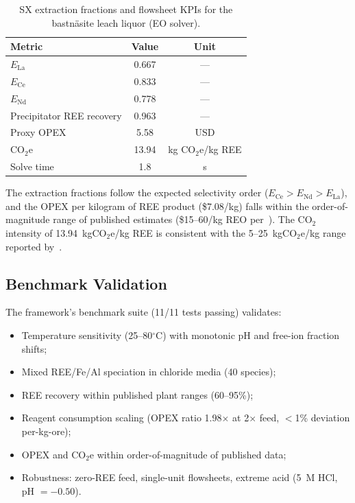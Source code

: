 \documentclass[11pt]{article}
\begin{document}
\begin{table}[t]
  \centering
  \caption{SX extraction fractions and flowsheet KPIs for the
    bastn\"asite leach liquor (EO solver).}
  \label{tab:sx_results}
  \begin{tabular}{@{}lcc@{}}
    \toprule
    Metric & Value & Unit \\
    \midrule
    $E_{\text{La}}$ & 0.667 & --- \\
    $E_{\text{Ce}}$ & 0.833 & --- \\
    $E_{\text{Nd}}$ & 0.778 & --- \\
    Precipitator REE recovery & 0.963 & --- \\
    Proxy OPEX & 5.58 & USD \\
    CO$_2$e & 13.94 & kg CO$_2$e/kg REE \\
    Solve time & 1.8 & s \\
    \bottomrule
  \end{tabular}
\end{table}

The extraction fractions follow the expected selectivity order
($E_{\text{Ce}} > E_{\text{Nd}} > E_{\text{La}}$), and the OPEX per
kilogram of REE product (\$7.08/kg) falls within the order-of-magnitude
range of published estimates (\$15--60/kg REO per~\citet{golev2014rare}).
The CO$_2$ intensity of 13.94~kgCO$_2$e/kg REE is consistent with the
5--25~kgCO$_2$e/kg range reported by~\citet{zaimes2015design}.


\subsection{Benchmark Validation}

The framework's benchmark suite (11/11 tests passing) validates:
\begin{itemize}
  \item Temperature sensitivity (25--80$^\circ$C) with monotonic
    pH and free-ion fraction shifts;
  \item Mixed REE/Fe/Al speciation in chloride media (40 species);
  \item REE recovery within published plant ranges (60--95\%);
  \item Reagent consumption scaling (OPEX ratio 1.98$\times$ at
    2$\times$ feed, $<$1\% deviation per-kg-ore);
  \item OPEX and CO$_2$e within order-of-magnitude of published data;
  \item Robustness: zero-REE feed, single-unit flowsheets, extreme
    acid (5~M HCl, pH $= -0.50$).
\end{itemize}
\end{document}
